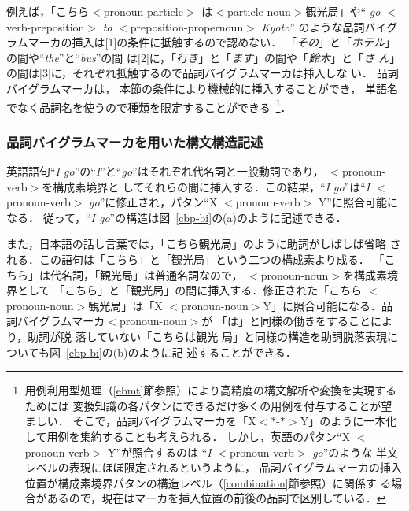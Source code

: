 \vspace*{6mm}

例えば，「こちら{\footnotesize $<$}pronoun-particle{\footnotesize $>$}
は{\footnotesize $<$}particle-noun{\footnotesize $>$}観光局」や``{\it
go} {\footnotesize $<$}verb-preposition{\footnotesize $>$} {\it to}
{\footnotesize $<$}preposition-propernoun{\footnotesize $>$} {\it Kyoto}''
のような品詞バイグラムマーカの挿入は[1]の条件に抵触するので認めない．
「{\it その}」と「{\it ホテル}」の間や``{\it the}''と``{\it bus}''の間
は[2]に，「{\it 行き}」と「{\it ます}」の間や「{\it 鈴木}」と「{\it さ
ん}」の間は[3]に，それぞれ抵触するので品詞バイグラムマーカは挿入しな
い．
品詞バイグラムマーカは，
本節の条件により機械的に挿入することができ，
単語名でなく品詞名を使うので種類を限定することができる~\footnote{
用例利用型処理（\ref{ebmt}節参照）により高精度の構文解析や変換を実現するためには
変換知識の各パタンにできるだけ多くの用例を付与することが望ましい．
そこで，品詞バイグラムマーカを「X{\footnotesize $<$}$\ast$-$\ast${\footnotesize $>$}Y」のように一本化
して用例を集約することも考えられる．
しかし，英語のパタン``X {\footnotesize $<$}pronoun-verb{\footnotesize $>$} Y''が照合するのは
``{\it I} {\footnotesize $<$}pronoun-verb{\footnotesize $>$} {\it go}''のような
単文レベルの表現にほぼ限定されるというように，
品詞バイグラムマーカの挿入位置が構成素境界パタンの構造レベル（\ref{combination}節参照）に関係す
る場合があるので，現在はマーカを挿入位置の前後の品詞で区別している．}．

\subsubsection{品詞バイグラムマーカを用いた構文構造記述}

英語語句``{\it I go}''の``{\it I}''と``{\it go}''はそれぞれ代名詞と一般動詞であり，
{\footnotesize $<$}pronoun-verb{\footnotesize $>$}を\mbox{構成}素境界と
してそれらの間に挿入する．この結果，``{\it I go}''は``{\it I} {\footnotesize
$<$}pronoun-verb{\footnotesize $>$} {\it go}''に修正され，パタン``X
{\footnotesize $<$}pronoun-verb{\footnotesize $>$} Y''に照合可能になる．
従って，``{\it I go}''の構造は図~\ref{cbp-bi}の(a)のように記述できる．

また，日本語の話し言葉では，「こちら観光局」のように助詞がしばしば省略
される．この語句は「こちら」と「観光局」という二つの構成素より成る．
「こちら」は代名詞，「観光局」は普通名詞なので，
{\footnotesize $<$}pronoun-noun{\footnotesize $>$}を構成素境界として
「こちら」と「観光局」の間に挿入する．修正された「こちら{\footnotesize
$<$}pronoun-noun{\footnotesize $>$}観光局」は「X{\footnotesize
$<$}pronoun-noun{\footnotesize $>$}Y」に照合可能になる．品
詞バイグラムマーカ{\footnotesize $<$}pronoun-noun{\footnotesize $>$}が
「は」と同様の働きをすることにより，助詞が脱\break
落していない「こちらは観光
局」と同様の構造を助詞脱落表現についても図~\ref{cbp-bi}の(b)のように記
述することができる．

